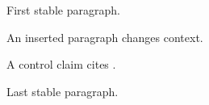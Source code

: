First stable paragraph.

An inserted paragraph changes context.

A control claim cites \cite{beta}.

Last stable paragraph.

